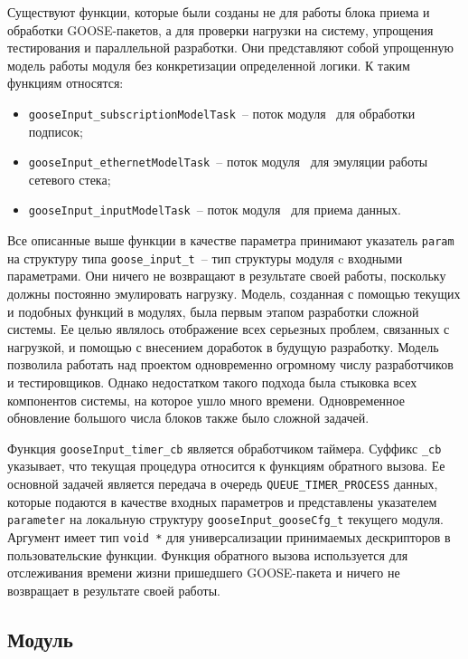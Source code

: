 Существуют функции, которые были созданы не для работы блока приема и обработки GOOSE-пакетов, а для проверки нагрузки на систему, упрощения тестирования и параллельной разработки. Они представляют собой упрощенную модель работы модуля без конкретизации определенной логики. К таким функциям относятся:

\begin{itemize}
    \item \lstinline{gooseInput_subscriptionModelTask}~-- поток модуля \moduleRecvPackets\ для обработки подписок;
    \item \lstinline{gooseInput_ethernetModelTask}~-- поток модуля \moduleRecvPackets\ для эмуляции работы сетевого стека;
    \item \lstinline{gooseInput_inputModelTask}~-- поток модуля \moduleRecvPackets\ для приема данных.
\end{itemize}

Все описанные выше функции в качестве параметра принимают указатель \lstinline{param} на структуру типа \lstinline{goose_input_t}~-- тип структуры модуля c входными параметрами. Они ничего не возвращают в результате своей работы,
поскольку должны постоянно эмулировать нагрузку. Модель, созданная с помощью текущих и подобных функций в модулях, была первым этапом разработки сложной системы. Ее целью являлось отображение всех серьезных проблем, связанных с нагрузкой, и помощью с внесением доработок в будущую разработку. Модель позволила работать над проектом одновременно огромному числу разработчиков и тестировщиков. Однако недостатком такого подхода была стыковка всех компонентов системы, на которое ушло много времени. Одновременное обновление большого числа блоков также было сложной задачей.

Функция \lstinline{gooseInput_timer_cb} является обработчиком таймера. Суффикс \lstinline{_cb} указывает, что текущая процедура относится к функциям обратного вызова. Ее основной задачей
является передача в очередь \lstinline{QUEUE_TIMER_PROCESS} данных, которые подаются в качестве входных параметров и представлены указателем \lstinline{parameter} на локальную структуру \lstinline{gooseInput_gooseCfg_t} текущего модуля.
Аргумент имеет тип \lstinline{void *} для универсализации принимаемых
дескрипторов в пользовательские функции.
Функция обратного вызова используется для отслеживания времени жизни пришедшего GOOSE-пакета и ничего не возвращает в результате своей работы.

\subsection{Модуль \moduleProcessPackets}

